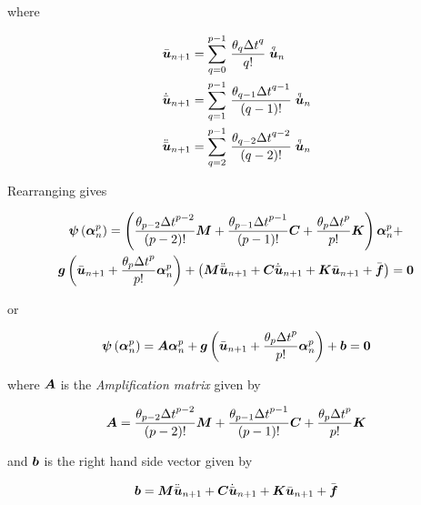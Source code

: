 where

\begin{equation}
  \begin{split}
    \bar{\vect{u}}_{n+1} &= \gsum{q=0}{p-1}{\dfrac{\theta_{q}{\Delta
            t}^{q}}{q!}\symover{q}{\vect{u}}_{n}} \\
    \dot{\bar{\vect{u}}}_{n+1} &= \gsum{q=1}{p-1}{\dfrac{\theta_{q-1}{\Delta
            t}^{q-1}}{\factorial{q-1}}\symover{q}{\vect{u}}_{n}} \\
    \ddot{\bar{\vect{u}}}_{n+1} &= \gsum{q=2}{p-1}{\dfrac{\theta_{q-2}{\Delta
            t}^{q-2}}{\factorial{q-2}}\symover{q}{\vect{u}}_{n}} 
  \end{split}
\end{equation}

Rearranging gives

\begin{multline}
  \fnof{\vect{\psi}}{\vect{\alpha}^{p}_{n}}=\pbrac{\dfrac{\theta_{p-2}{\Delta
        t}^{p-2}}{\factorial{p-2}}\matr{M}+\dfrac{\theta_{p-1}{\Delta
        t}^{p-1}}{\factorial{p-1}}\matr{C}+\dfrac{\theta_{p}{\Delta
        t}^{p}}{p!}\matr{K}}\vect{\alpha}^{p}_{n}+ \\
  \fnof{\vect{g}}{\bar{\vect{u}}_{n+1}+\dfrac{\theta_{p}{\Delta t}^{p}}{p!}\vect{\alpha}^{p}_{n}}+ 
  \pbrac{\matr{M}\ddot{\bar{\vect{u}}}_{n+1}+\matr{C}\dot{\bar{\vect{u}}}_{n+1}+\matr{K}\bar{\vect{u}}_{n+1}+
    \bar{\vect{f}}}= \vect{0}
  \label{eqn:transient}
\end{multline}

or 

\begin{equation}
\fnof{\vect{\psi}}{\vect{\alpha}^{p}_{n}}=\matr{A}\vect{\alpha}^{p}_{n}+
\fnof{\vect{g}}{\bar{\vect{u}}_{n+1}+ \dfrac{\theta_{p}{\Delta
      t}^{p}}{p!}\vect{\alpha}^{p}_{n}}+\vect{b}= \vect{0}
\end{equation}

where $\matr{A}$ is the \emph{Amplification matrix} given by

\begin{equation}
  \matr{A}=\dfrac{\theta_{p-2}{\Delta t}^{p-2}}{\factorial{p-2}}\matr{M}+
  \dfrac{\theta_{p-1}{\Delta t}^{p-1}}{\factorial{p-1}}\matr{C}+
  \dfrac{\theta_{p}{\Delta t}^{p}}{p!}\matr{K}
\end{equation}

and $\vect{b}$ is the right hand side vector given by

\begin{equation}
  \vect{b}=\matr{M}\ddot{\bar{\vect{u}}}_{n+1}+\matr{C}\dot{\bar{\vect{u}}}_{n+1}+
  \matr{K}\bar{\vect{u}}_{n+1}+\bar{\vect{f}}
\end{equation}


